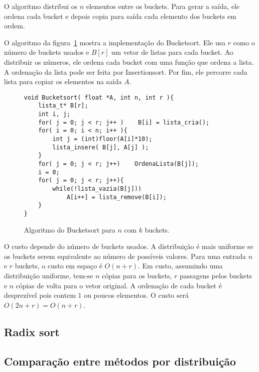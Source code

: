 O algoritmo distribui os $n$ elementos entre os buckets.
Para gerar a saída, ele ordena cada bucket e depois copia para saída 
cada elemento dos buckets em ordem.

O algoritmo da figura~\ref{aula03:algo:bucket} mostra a implementação do
Bucketsort.
Ele usa $r$ como o número de buckets usados e $B[r]$ um vetor de listas para
cada bucket.
Ao distribuir os números, ele ordena cada bucket com uma função
que ordena a lista. A ordenação da lista pode ser feita por
Insertionsort.
Por fim, ele percorre cada lista para copiar os elementos na saída $A$.
%
\begin{figure}[!htb]
\centering
\begin{framed}
\begin{lstlisting}
void Bucketsort( float *A, int n, int r ){
	lista_t* B[r];
	int i, j;
	for( j = 0; j < r; j++ )    B[i] = lista_cria();
	for( i = 0; i < n; i++ ){
		int j = (int)floor(A[i]*10);
		lista_insere( B[j], A[j] );
	}
	for( j = 0; j < r; j++)    OrdenaLista(B[j]);
	i = 0;
	for( j = 0; j < r; j++){
		while(!lista_vazia(B[j]))
			A[i++] = lista_remove(B[i]);
	}
}
\end{lstlisting}
\end{framed}
\caption{Algoritmo do Bucketsort para $n$ com $k$ buckets.}
\label{aula03:algo:bucket}
\end{figure}

O custo depende do número de buckets usados. 
A distribuição é mais uniforme se os buckets serem equivalente ao número de possíveis valores.
Para uma entrada $n$ e $r$ buckets, o custo em espaço é $O(n+r)$.
Em custo, assumindo uma distribuição uniforme, tem-se $n$ cópias para os buckets, $r$ passagens pelos buckets e
$n$ cópias de volta para o vetor original.
A ordenação de cada bucket é desprezível pois contem $1$ ou poucos elementos.
O custo será $O(2n+r) = O(n+r)$.

\subsection{Radix sort}

\subsection{Comparação entre métodos por distribuição}

